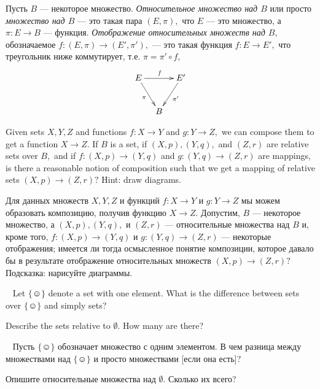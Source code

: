 \documentclass[../main/CT4S-EN-RU]{subfiles}
\begin{document}
\begin{definitionRUS}\label{def:relative sets}
Пусть $B$ — некоторое множество. {\em Относительное множество над $B$} или просто {\em множество над $B$} — это такая пара $(E,\pi),$ что $E$ — это множество, а $\pi\colon E{→} B$ — функция. {\em Отображение относительных множеств над $B$}, обозначаемое $f\colon (E,\pi){→}(E',\pi'),$ — это такая функция $f\colon E{→} E',$ что треугольник ниже коммутирует, т.е. $\pi=\pi'\circ f,$
$$
\xymatrix@=10pt{E\ar[rr]^f\ar[rdd]_{\pi}&&E'\ar[ldd]^{\pi'}\\\\&B
}
$$
\end{definitionRUS}

\begin{exerciseENG}
Given sets $X,Y,Z$ and functions $f\colon X{→} Y$ and $g\colon Y{→} Z,$ we can compose them to get a function $X{→} Z.$ If $B$ is a set, if $(X,p), (Y,q),$ and $(Z,r)$ are relative sets over $B,$ and if $f\colon (X,p){→} (Y,q)$ and $g\colon (Y,q){→} (Z,r)$ are mappings, is there a reasonable notion of composition such that we get a mapping of relative sets $(X,p){→} (Z,r)?$ Hint: draw diagrams.
\end{exerciseENG}

\begin{exerciseRUS}
Для данных множеств $X,Y,Z$ и функций $f\colon X{→} Y$ и $g\colon Y{→} Z$ мы можем образовать композицию, получив функцию $X{→} Z.$ Допустим, $B$ — некоторое множество, а $(X,p), (Y,q),$ и $(Z,r)$ — относительные множества над $B$ и, кроме того, $f\colon (X,p){→} (Y,q)$ и $g\colon (Y,q){→} (Z,r)$ — некоторые отображения; имеется ли тогда осмысленное понятие композиции, которое давало бы в результате отображение относительных множеств $(X,p){→} (Z,r)?$ Подсказка: нарисуйте диаграммы.
\end{exerciseRUS}

\begin{exerciseENG}~
\sexc Let ${\{☺\}}$ denote a set with one element. What is the difference between sets over ${\{☺\}}$ and simply sets?
\item Describe the sets relative to $\emptyset.$ How many are there?
\endsexc
\end{exerciseENG}

\begin{exerciseRUS}~
\sexc Пусть ${\{☺\}}$ обозначает множество с одним элементом. В чем разница между множествами над ${\{☺\}}$ и просто множествами [если она есть]?
\item Опишите относительные множества над $\emptyset.$ Сколько их всего?
\endsexc
\end{exerciseRUS}
\end{document}
